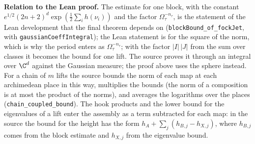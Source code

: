 \documentclass[11pt,letterpaper]{article}
\begin{document}
\textbf{Relation to the Lean proof.} The estimate for one block, with the constant
$e^{1/2}(2n+2)^d\exp(\frac12\sum_ih(\nu_i))$ and the factor $\Omega_\tau^{-n_\tau}$, is the statement of the
Lean development that the final theorem depends on (\texttt{blockBound\_of\_fockJet}, with
\texttt{gaussianCoeffIntegral}); the Lean statement is for the square of the norm, which is why the period enters as $\Omega_\tau^{-n_\tau}$;
with the factor $|I|\,|J|$ from the sum over classes it becomes the bound for one lift. The source proves it through an integral over $\C^d$ against the Gaussian measure; the proof
above uses the sphere instead. For a chain of $m$ lifts the source bounds the norm of each map at each
archimedean place in this way, multiplies the bounds (the norm of a composition is at most the product of
the norms), and averages the logarithms over the places (\texttt{chain\_coupled\_bound}). The hook products and the
lower bound for the eigenvalues of a lift enter the assembly as a term subtracted for each map: in the
source the bound for the height has the form $h_A+\sum_j(h_{B,j}-h_{X,j})$, where $h_{B,j}$ comes from the
block estimate and $h_{X,j}$ from the eigenvalue bound.
\end{document}
